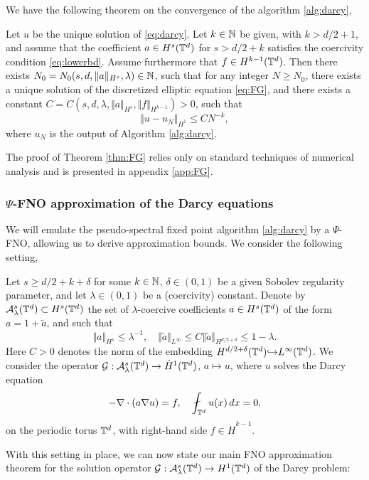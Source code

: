 \documentclass[reqno,a4paper]{amsart}
\begin{document}
We have the following theorem on the convergence of the algorithm \ref{alg:darcy},
\begin{theorem} \label{thm:FG}
Let $u$ be the unique solution of \eqref{eq:darcy}. Let $k\in \mathbb{N}$ be given, with $k>d/2+1$, and assume that the coefficient $a\in H^s(\mathbb{T}^d)$ for $s> d/2 + k$ satisfies the coercivity condition \eqref{eq:lowerbd}. Assume furthermore that $f \in H^{k-1}(\mathbb{T}^d)$. Then there exists $N_0 = N_0(s,d,\Vert a \Vert_{H^s},\lambda)\in \mathbb{N}$, such that for any integer $N \ge N_0$, there exists a unique solution of the discretized elliptic equation \eqref{eq:FG}, and there exists a constant $C = C(s,d,\lambda, \Vert a \Vert_{H^s}, \Vert f \Vert_{H^{k-1}})>0$, such that 
\[
\Vert u - u_N \Vert_{H^1} \le C N^{-k},
\]
where $u_N$ is the output of Algorithm \ref{alg:darcy}.
\end{theorem}

The proof of Theorem \ref{thm:FG} relies only on standard techniques of numerical analysis and is presented in appendix \ref{app:FG}. 

\subsubsection{$\Psi$-FNO approximation of the Darcy equations }
We will emulate the pseudo-spectral fixed point algorithm \ref{alg:darcy} by a $\Psi$-FNO, allowing us to derive approximation bounds. We consider the following setting,
\begin{setting} \label{set:darcy}
Let $s\ge d/2+k+\delta$ for some $k\in \mathbb{N}$, $\delta\in (0,1)$ be a given Sobolev regularity parameter, and let $\lambda \in (0,1)$ be a (coercivity) constant. Denote by $\mathcal{A}_\lambda^s(\mathbb{T}^d) \subset H^s(\mathbb{T}^d)$ the set of $\lambda$-coercive coefficients $a\in H^s(\mathbb{T}^d)$ of the form $a = 1 + \tilde{a}$, and such that
\[
\Vert a \Vert_{H^s} \le \lambda^{-1},
\quad
\Vert \tilde{a}\Vert_{L^\infty} \le C \Vert \tilde{a} \Vert_{H^{d/2+\delta}} \le 1-\lambda.
\]
Here $C>0$ denotes the norm of the embedding $H^{d/2+\delta}(\mathbb{T}^d) {\hookrightarrow} L^\infty(\mathbb{T}^d)$. We consider the operator $\mathcal{G}: \mathcal{A}^s_\lambda(\mathbb{T}^d) \to \dot{H}^1(\mathbb{T}^d)$, $a \mapsto u$, where $u$ solves the Darcy equation 
\[
-\nabla \cdot \left(a\nabla u\right) = f,
\quad
\fint_{\T^d} u(x) \, dx = 0,
\]
on the periodic torus $\mathbb{T}^d$, with right-hand side $f \in \dot{H}^{k-1}$.
\end{setting}

With this setting in place, we can now state our main FNO approximation theorem for the solution operator $\mathcal{G}: \mathcal{A}^s_\lambda(\mathbb{T}^d) \to H^1(\mathbb{T}^d)$ of the Darcy problem:
\end{document}

